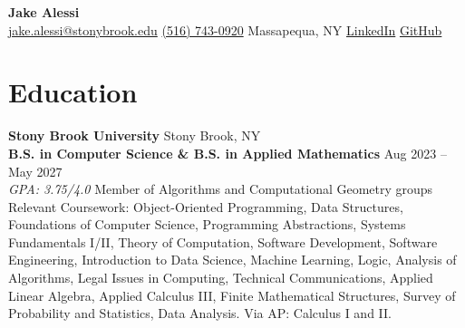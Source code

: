 \documentclass[a4paper,10pt]{article}
\newcommand{\company}[1]{\textit{\small #1}}
\begin{document}
\begin{center}
{\LARGE \textbf{Jake Alessi}} \\
\vspace{2pt}
\href{mailto:jake.alessi@stonybrook.edu}{jake.alessi@stonybrook.edu} \textbar{} \href{tel:+15167430920}{(516) 743-0920} \textbar{} Massapequa, NY \textbar{} \href{https://www.linkedin.com/in/jake-thomas-alessi/}{LinkedIn} \textbar{} \href{https://github.com/jakealessi}{GitHub}
\end{center}
\vspace{-4pt}
\section*{Education}
\noindent\textbf{Stony Brook University} \hfill Stony Brook, NY \\
\textbf{B.S. in Computer Science \& B.S. in Applied Mathematics} \hfill Aug 2023 -- May 2027 \\
\company{GPA: 3.75/4.0} \textbar{} Member of Algorithms and Computational Geometry groups \\[2pt]
Relevant Coursework: Object-Oriented Programming, Data Structures, Foundations of Computer Science, Programming Abstractions, Systems Fundamentals I/II, Theory of Computation, Software Development, Software Engineering, Introduction to Data Science, Machine Learning, Logic, Analysis of Algorithms, Legal Issues in Computing, Technical Communications, Applied Linear Algebra, Applied Calculus III, Finite Mathematical Structures, Survey of Probability and Statistics, Data Analysis. Via AP: Calculus I and II.
\vspace{2pt}
\end{document}
